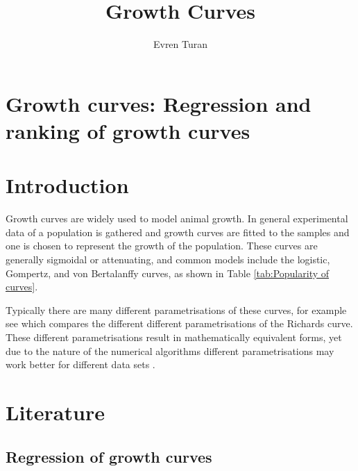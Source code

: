 \documentclass[12pt,a4paper]{article}
\author{Evren Turan}
\title{Growth Curves}
\begin{document}
	\section*{Growth curves: Regression and ranking of growth curves}
	\section{Introduction}
	Growth curves are widely used to model animal growth. In general experimental data of a population is gathered and growth curves are fitted to the samples and one is chosen to represent the growth of the population. These curves are generally sigmoidal or attenuating, and common models include the logistic, Gompertz, and von Bertalanffy curves, as shown in Table \ref{tab:Popularity of curves}.
	
	Typically there are many different parametrisations of these curves, for example see \textcite{Tjorve2010} which compares the different different parametrisations of the Richards curve. These different parametrisations result in mathematically equivalent forms, yet due to the nature of the numerical algorithms different parametrisations may work better for different data sets \textcite{Myhrvold2013}.
	\section{Literature}
	\subsection{Regression of growth curves}
	
\end{document}
